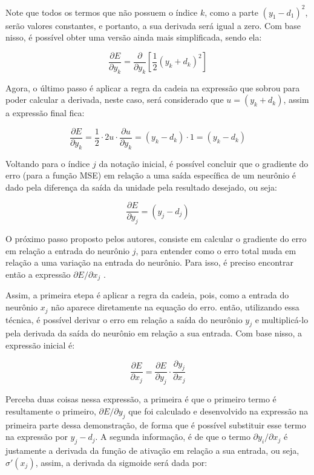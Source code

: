 Note que todos os termos que não possuem o índice $k$, como a parte $(y_1 - d_1)^2$, serão valores constantes, e portanto, a sua derivada será igual a zero. Com base nisso, é possível obter uma versão ainda mais simplificada, sendo ela:

\[
    \frac{\partial E}{\partial y_k} = \frac{\partial}{\partial y_k} \left[ \frac{1}{2} (y_k + d_k)^2 \right]
\]

Agora, o último passo é aplicar a regra da cadeia na expressão que sobrou para poder calcular a derivada, neste caso, será considerado que $u = (y_k + d_k)$, assim a expressão final fica:

\[
    \frac{\partial E}{\partial y_k} = \frac{1}{2} \cdot 2u \cdot \frac{\partial u}{\partial y_k} = (y_k - d_k) \cdot 1 = (y_k - d_k)
\]

Voltando para o índice $j$ da notação inicial, é possível concluir que o gradiente do erro (para a função MSE) em relação a uma saída específica de um neurônio é dado pela diferença da saída da unidade pela resultado desejado, ou seja:

\[
    \frac{\partial E}{\partial y_j} = (y_j - d_j) 
\]

O próximo passo proposto pelos autores, consiste em calcular o gradiente do erro em relação a entrada do neurônio $j$, para entender como o erro total muda em relação a uma variação na entrada do neurônio. Para isso, é preciso encontrar então a expressão $\partial E / \partial x_j$ \parencite{BackpropagationArticle}.

Assim, a primeira etepa é aplicar a regra da cadeia, pois, como a entrada do neurônio $x_j$ não aparece diretamente na equação do erro. então, utilizando essa técnica, é possível derivar o erro em relação a saída do neurônio $y_j$ e multiplicá-lo pela derivada da saída do neurônio em relação a sua entrada. Com base nisso, a expressão inicial é:

\[
    \frac{\partial E}{\partial x_j} = \frac{\partial E}{\partial y_j} \cdot \frac{\partial y_j}{\partial x_j}
\]

Perceba duas coisas nessa expressão, a primeira é que o primeiro termo é resultamente o primeiro, $\partial E / \partial y_j$ que foi calculado e desenvolvido na expressão na primeira parte dessa demonstração, de forma que é possível substituir esse termo na expressão por $y_j - d_j$. A segunda informação, é de que o termo $\partial y_i / \partial x_j$ é justamente a derivada da função de ativação em relação a sua entrada, ou seja, $\sigma'(x_j)$, assim, a derivada da sigmoide será dada por:

